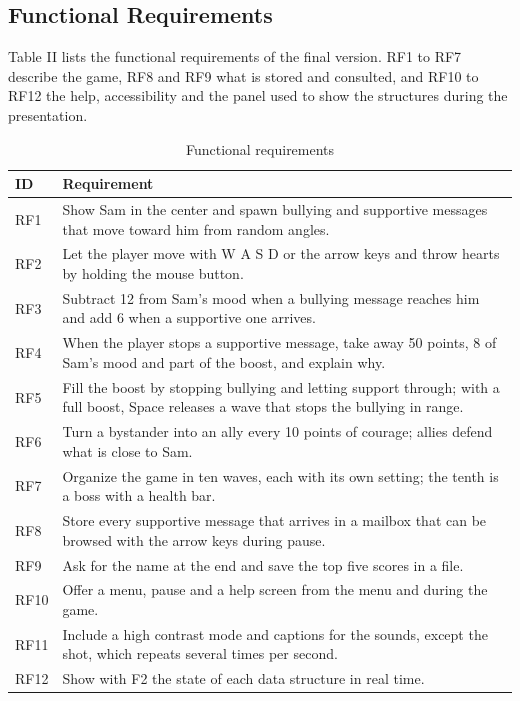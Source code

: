 \documentclass[conference]{IEEEtran}
\begin{document}
\subsection{Functional Requirements}

Table II lists the functional requirements of the final version. RF1 to RF7 describe the game, RF8 and RF9 what is stored and consulted, and RF10 to RF12 the help, accessibility and the panel used to show the structures during the presentation.

\begin{table}[!htbp]
\centering
\caption{Functional requirements}
\footnotesize
\begin{tabularx}{\textwidth}{|P{2.6cm}|X|}
\hline
\textbf{ID} & \textbf{Requirement} \\ \hline
RF1 & Show Sam in the center and spawn bullying and supportive messages that move toward him from random angles. \\ \hline
RF2 & Let the player move with W A S D or the arrow keys and throw hearts by holding the mouse button. \\ \hline
RF3 & Subtract 12 from Sam's mood when a bullying message reaches him and add 6 when a supportive one arrives. \\ \hline
RF4 & When the player stops a supportive message, take away 50 points, 8 of Sam's mood and part of the boost, and explain why. \\ \hline
RF5 & Fill the boost by stopping bullying and letting support through; with a full boost, Space releases a wave that stops the bullying in range. \\ \hline
RF6 & Turn a bystander into an ally every 10 points of courage; allies defend what is close to Sam. \\ \hline
RF7 & Organize the game in ten waves, each with its own setting; the tenth is a boss with a health bar. \\ \hline
RF8 & Store every supportive message that arrives in a mailbox that can be browsed with the arrow keys during pause. \\ \hline
RF9 & Ask for the name at the end and save the top five scores in a file. \\ \hline
RF10 & Offer a menu, pause and a help screen from the menu and during the game. \\ \hline
RF11 & Include a high contrast mode and captions for the sounds, except the shot, which repeats several times per second. \\ \hline
RF12 & Show with F2 the state of each data structure in real time. \\ \hline
\end{tabularx}
\end{table}
\end{document}
